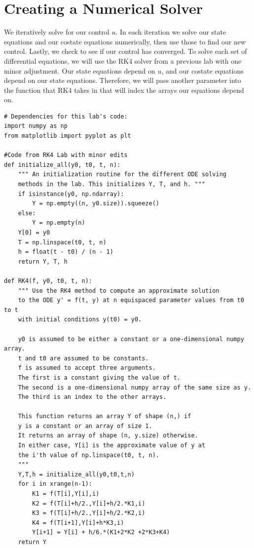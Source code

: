 \section*{Creating a Numerical Solver}

We iteratively solve for our control $u$. In each iteration we solve our state equations and our costate equations numerically, then use those to find our new control. Lastly, we check to see if  our control has converged. To solve each set of differential equations, we will use the RK4 solver from a previous lab with one minor adjustment. Our state equations depend on $u$, and our costate equations depend on our state equations. Therefore, we will pass another parameter into the function that RK4 takes in that will index the arrays our equations depend on.

\begin{lstlisting}
# Dependencies for this lab's code:
import numpy as np
from matplotlib import pyplot as plt

#Code from RK4 Lab with minor edits				
def initialize_all(y0, t0, t, n):
    """ An initialization routine for the different ODE solving
    methods in the lab. This initializes Y, T, and h. """
    if isinstance(y0, np.ndarray):
        Y = np.empty((n, y0.size)).squeeze()
    else:
        Y = np.empty(n)
    Y[0] = y0
    T = np.linspace(t0, t, n)
    h = float(t - t0) / (n - 1)
    return Y, T, h

def RK4(f, y0, t0, t, n):
    """ Use the RK4 method to compute an approximate solution
    to the ODE y' = f(t, y) at n equispaced parameter values from t0 to t
    with initial conditions y(t0) = y0.
    
    y0 is assumed to be either a constant or a one-dimensional numpy array.
    t and t0 are assumed to be constants.
    f is assumed to accept three arguments.
    The first is a constant giving the value of t.
    The second is a one-dimensional numpy array of the same size as y.
    The third is an index to the other arrays.
    
    This function returns an array Y of shape (n,) if
    y is a constant or an array of size 1.
    It returns an array of shape (n, y.size) otherwise.
    In either case, Y[i] is the approximate value of y at
    the i'th value of np.linspace(t0, t, n).
    """
    Y,T,h = initialize_all(y0,t0,t,n)
    for i in xrange(n-1):
        K1 = f(T[i],Y[i],i)
        K2 = f(T[i]+h/2.,Y[i]+h/2.*K1,i)
        K3 = f(T[i]+h/2.,Y[i]+h/2.*K2,i)
        K4 = f(T[i+1],Y[i]+h*K3,i)
        Y[i+1] = Y[i] + h/6.*(K1+2*K2 +2*K3+K4)
    return Y
\end{lstlisting}

